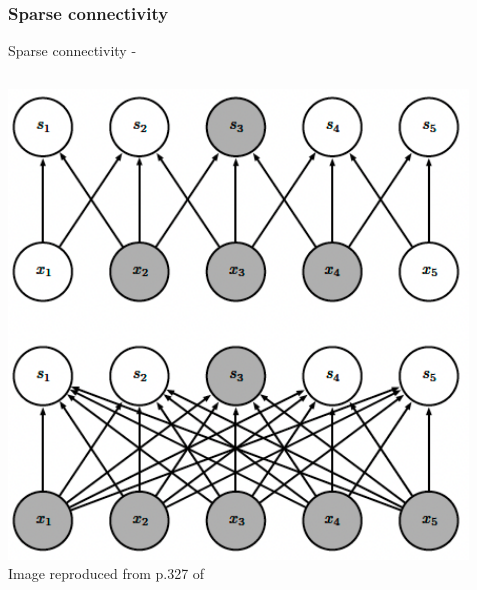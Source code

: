 \subsubsection{Sparse connectivity}
\begin{frame}[t,allowframebreaks]{Sparse connectivity -}

    \begin{columns}
        \begin{column}{0.50\textwidth}
         \begin{center}
          \includegraphics[width=1.0\textwidth]
          {./images/cnn/sparse_connectivity/goodfellow17_sparse_connectivity_from_above_01.png}\\
          {\scriptsize \color{col:attribution} 
          Image reproduced from p.327 of \cite{Goodfellow:2017MITDL}}\\
         \end{center}
        \end{column}
        \begin{column}{0.50\textwidth}
        \end{column}
    \end{columns}

    \framebreak


\end{frame}
